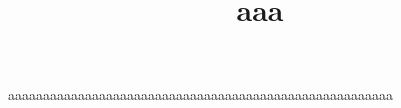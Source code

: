 \documentclass{article}
\title{aaa}
\begin{document}
aaaaaaaaaaaaaaaaaaaaaaaaaaaaaaaaaaaaaaaaaaaaaaaaaaaaaaa
\end{document}
